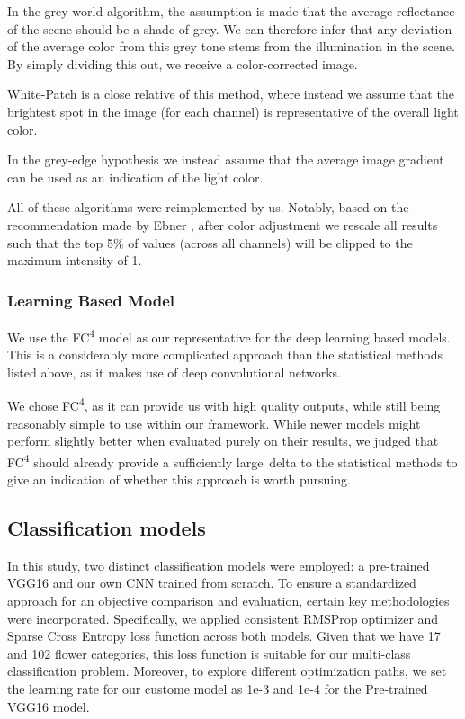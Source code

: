 In the grey world algorithm, the assumption is made that the average reflectance of the scene should
be a shade of grey. We can therefore infer that any deviation of the average color from this grey tone stems from
the illumination in the scene. By simply dividing this out, we receive a color-corrected image.

White-Patch is a close relative of this method, where instead we assume that the brightest spot in the image (for each channel)
is representative of the overall light color.

In the grey-edge hypothesis we instead assume that the average image gradient can be used as an indication of the light color.

All of these algorithms were reimplemented by us. Notably, based on the recommendation made by Ebner \cite{EbnerConstancy},
after color adjustment we rescale all results such that the top 5\% of values (across all channels) will be clipped to
the maximum intensity of 1.

\subsubsection{Learning Based Model}

We use the FC\textsuperscript{4} model\cite{hu2017fc} as our representative for the deep learning based models. This is a considerably more complicated approach
than the statistical methods listed above, as it makes use of deep convolutional networks.

We chose FC\textsuperscript{4}, as it can provide us with high quality outputs, while still being reasonably simple to use within our framework. While newer
models might perform slightly better when evaluated purely on their results, we judged that FC\textsuperscript{4} should already provide a sufficiently large\
delta to the statistical methods to give an indication of whether this approach is worth pursuing.

\subsection{Classification models}

In this study, two distinct classification models were employed: a pre-trained VGG16 and our own \gls{CNN} trained from scratch.
To ensure a standardized approach for an objective comparison and evaluation, certain key methodologies were incorporated.
Specifically, we applied consistent RMSProp optimizer and Sparse Cross Entropy loss function across both models.
Given that we have 17 and 102 flower categories, this loss function is suitable for our multi-class classification problem. Moreover, to explore different optimization paths, we set the learning rate
for our custome model as 1e-3 and 1e-4 for the Pre-trained VGG16 model.

